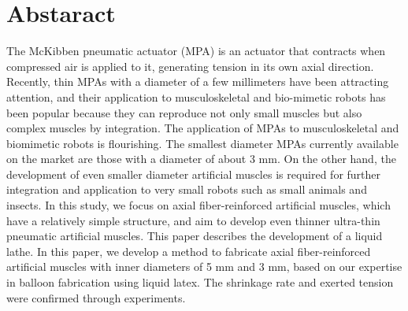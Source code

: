\newpage
\section*{Abstaract}
The McKibben pneumatic actuator (MPA) is an actuator that contracts when compressed air is applied to it, generating tension in its own axial direction.
Recently, thin MPAs with a diameter of a few millimeters have been attracting attention, and their application to musculoskeletal and bio-mimetic robots has been popular because they can reproduce not only small muscles but also complex muscles by integration.
The application of MPAs to musculoskeletal and biomimetic robots is flourishing. The smallest diameter MPAs currently available on the market are those with a diameter of about 3 mm.
On the other hand, the development of even smaller diameter artificial muscles is required for further integration and application to very small robots such as small animals and insects. In this study, we focus on axial fiber-reinforced artificial muscles, which have a relatively simple structure, and aim to develop even thinner ultra-thin pneumatic artificial muscles.
This paper describes the development of a liquid lathe. In this paper, we develop a method to fabricate axial fiber-reinforced artificial muscles with inner diameters of 5 mm and 3 mm, based on our expertise in balloon fabrication using liquid latex.
The shrinkage rate and exerted tension were confirmed through experiments.